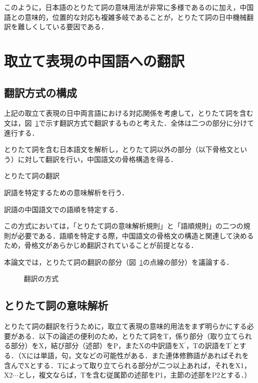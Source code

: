 このように，日本語のとりたて詞の意味用法が非常に多様であるのに加え，中国語との意味的，位置的な対応も複雑多岐であることが，とりたて詞の日中機械翻訳を難しくしている要因である．

\section{取立て表現の中国語への翻訳}
\subsection{翻訳方式の構成}
上記の取立て表現の日中両言語における対応関係を考慮して，とりたて詞を含む文は，図~\ref{housiki}で示す翻訳方式で翻訳するものと考えた．全体は二つの部分に分けて進行する．

\renewcommand{\theenumi}{}
\newcommand{\labelenumii}{}
\renewcommand{\theenumii}{}
\begin{enumerates}
 \item とりたて詞を含む日本語文を解析し，とりたて詞以外の部分（以下骨格文という）に対して翻訳を行い，中国語文の骨格構造を得る．
 \item とりたて詞の翻訳
       \begin{enumeratess}
	\item 訳語を特定するための意味解析を行う．
	\item 訳語の中国語文での語順を特定する．
       \end{enumeratess}
\end{enumerates}
\renewcommand{\theenumi}{}

この方式においては，「とりたて詞の意味解析規則」と「語順規則」の二つの規則が必要である．語順を特定する際，中国語文の骨格文の構造と関連して決めるため，骨格文があらかじめ翻訳されていることが前提となる．

本論文では，とりたて詞の翻訳の部分（図~\ref{housiki}の点線の部分）を議論する．

\begin{figure}[hbtp]
\begin{center}
\caption{翻訳の方式}
\label{housiki}
\end{center}
\end{figure}


\subsection{とりたて詞の意味解析}
とりたて詞の翻訳を行うために，取立て表現の意味的用法をまず明らかにする必要がある．以下の論述の便利のため，とりたて詞をT，係り部分（取り立てられる部分）をX，結び部分（述部）をP，またXの中訳語をX$^{\prime}$，Tの訳語をT$^{\prime}$とする．（Xには単語，句，文などの可能性がある．また連体修飾語があればそれを含んでXとする．Tによって取り立てられる部分が二つ以上あれば，それをX1，X2$\cdots$とし，複文ならば，Tを含む従属節の述部をP1，主節の述部をP2とする．）


